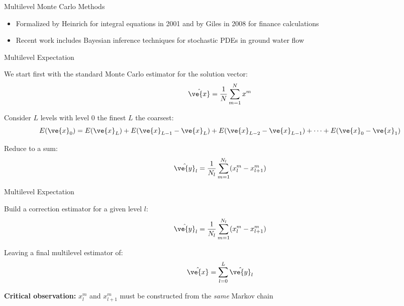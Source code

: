 \documentclass{beamer}
\begin{document}
\begin{frame}{Multilevel Monte Carlo Methods}

  \begin{itemize}
  \item Formalized by Heinrich for integral equations in 2001 and by
    Giles in 2008 for finance calculations
  \item Recent work includes Bayesian inference techniques for
    stochastic PDEs in ground water flow
  \end{itemize}

\end{frame}

\begin{frame}{Multilevel Expectation}

  We start first with the standard Monte Carlo estimator for the
  solution vector:
  \[
  \hat{\ve{x}} = \frac{1}{N} \sum_{m=1}^N x^m
  \]

  \medskip

  Consider $L$ levels with level 0 the finest $L$ the coarsest:
  \[
  E(\ve{x}_{0}) = E(\ve{x}_{L}) + E(\ve{x}_{L-1} - \ve{x}_{L}) +
  E(\ve{x}_{L-2} - \ve{x}_{L-1}) + \dots + E(\ve{x}_{0} - \ve{x}_{1})
  \]

  \medskip

  Reduce to a sum:
  \[
    \hat{\ve{y}}_{l} = \frac{1}{N_l} \sum_{m=1}^{N_l} (x^m_{l} -
    x^m_{l+1})
  \]

\end{frame}

\begin{frame}{Multilevel Expectation}

  Build a correction estimator for a given level $l$:
  \[
    \hat{\ve{y}}_{l} = \frac{1}{N_l} \sum_{m=1}^{N_l} (x^m_{l} -
    x^m_{l+1})
  \]

  \medskip

  Leaving a final multilevel estimator of:
  \[
  \hat{\ve{x}} = \sum_{l=0}^L \hat{\ve{y}}_{l}
  \]

  \medskip

  \textbf{Critical observation:} $x^m_{l}$ and $x^m_{l+1}$
  must be constructed from the \textit{same} Markov chain

\end{frame}
\end{document}

